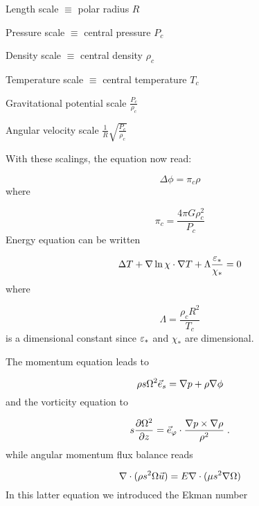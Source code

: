 \begin{center}\parbox{10cm}{

Length scale $\equiv$ polar radius \dotfill $R$

Pressure scale $\equiv$ central pressure \dotfill $P_c$

Density scale $\equiv$ central density \dotfill $\rho_c$

Temperature scale $\equiv$ central temperature \dotfill $T_c$

Gravitational potential scale \dotfill  $\frac{P_c}{\rho_c}$

Angular velocity scale \dotfill $\frac{1}{R}\sqrt{\frac{P_c}{\rho_c}}$


}
\end{center}\bigskip

With these scalings, the equation now read:

\begin{equation} \Delta\phi = \pi_c \rho\end{equation}
where

\begin{equation} \pi_c = \frac{4\pi G\rho_c^2}{P_c}\end{equation}
Energy equation can be written

\begin{equation} \Delta T + \nabla\ln\chi\cdot\nabla T +
\Lambda\frac{\varepsilon_*}{\chi_*} = 0\end{equation}
where

\begin{equation} \Lambda = \frac{\rho_c R^2}{T_c}\end{equation}
is a dimensional constant since $\varepsilon_*$ and $\chi_*$ are dimensional. 

The momentum equation leads to

\begin{equation}
\rho s\Omega^2\vec{e}_s=\nabla p+\rho\nabla\phi
\label{barocnd}
\end{equation}
and the vorticity equation to

\begin{equation}
s\frac{\partial\Omega^2}{\partial z}=\vec{e}_\varphi\cdot\frac{\nabla
p\times\nabla\rho}{\rho^2} \;.
\end{equation}
while angular momentum flux balance reads

\begin{equation}
\label{eq:angular_momnd}
\nabla\cdot{(\rho s^2\Omega\vec{u})}=E\nabla\cdot (\mu s^2\nabla\Omega)
\end{equation}
In this latter equation we introduced the Ekman number

